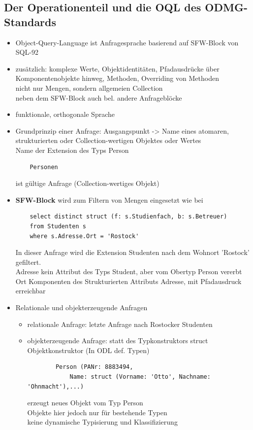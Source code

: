 \subsection{Der Operationenteil und die OQL des ODMG-Standards}
\begin{itemize}
	\item Object-Query-Language ist Anfragesprache basierend auf SFW-Block von SQL-92
	\item zusätzlich: komplexe Werte, Objektidentitäten, Pfadausdrücke über Komponentenobjekte hinweg, Methoden, Overriding von Methoden\\
	nicht nur Mengen, sondern allgemeien Collection\\
	neben dem SFW-Block auch bel. andere Anfrageblöcke
	\item funktionale, orthogonale Sprache
	\item Grundprinzip einer Anfrage: Ausgangspunkt -> Name eines atomaren, strukturierten oder Collection-wertigen Objektes oder Wertes\\
	Name der Extension des Typs Person
	\begin{lstlisting}
	Personen
	\end{lstlisting}
	ist gültige Anfrage (Collection-wertiges Objekt)
	\item \textbf{SFW-Block} wird zum Filtern von Mengen eingesetzt wie bei
	\begin{lstlisting}
	select distinct struct (f: s.Studienfach, b: s.Betreuer)
	from Studenten s
	where s.Adresse.Ort = 'Rostock'
	\end{lstlisting}
	In dieser Anfrage wird die Extension Studenten nach dem Wohnort 'Rostock' gefiltert.\\
	Adresse kein Attribut des Typs Student, aber vom Obertyp Person vererbt\\
	Ort Komponenten des Strukturierten Attributs Adresse, mit Pfadausdruck erreichbar
	
	\item Relationale und objekterzeugende Anfragen
	\begin{itemize}
		\item relationale Anfrage: letzte Anfrage nach Rostocker Studenten
		\item objekterzeugende Anfrage: statt des Typkonstruktors struct Objektkonstruktor (In ODL def. Typen)
		\begin{lstlisting}
		Person (PANr: 8883494,
			Name: struct (Vorname: 'Otto', Nachname: 'Ohnmacht'),...)
		\end{lstlisting}
		erzeugt neues Objekt vom Typ Person\\
		Objekte hier jedoch nur für bestehende Typen\\
		keine dynamische Typisierung und Klassifizierung
	\end{itemize}
	

\end{itemize}
